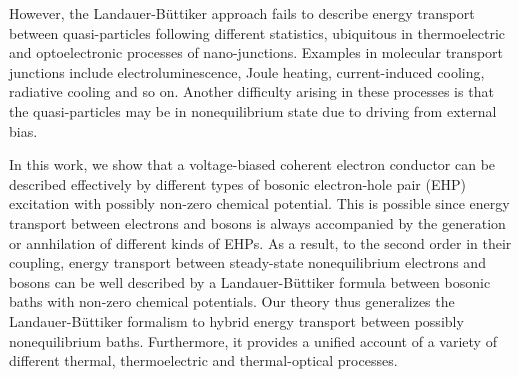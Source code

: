 \documentclass[aps
,twocolumn
,floatfix,footinbib,prl
]{revtex4-1}
\begin{document}

However, the Landauer-B\"uttiker approach fails to describe energy transport between quasi-particles following different statistics, ubiquitous in thermoelectric and optoelectronic processes of nano-junctions. Examples in molecular transport junctions include electroluminescence\cite{kuhnke2017atomic,galeprin2017photonics,schneider2010optical,schneider2012light}, Joule heating\cite{huang2007local,ioffe2008detection,lu_current-induced_2015,hartle2011resonant,hartle2011vibrational,hartle2018cooling}, current-induced cooling\cite{galperin2009cooling,simine2012vibrational,lykkebo2016single,hartle2011resonant}, radiative cooling\cite{zhu2019near} and so on. Another difficulty arising in these processes is that the quasi-particles may be in nonequilibrium state due to driving from external bias.

In this work, we show that a voltage-biased coherent electron conductor can be described effectively by different types of bosonic electron-hole pair (EHP) excitation with possibly non-zero chemical potential. 
This is possible since energy transport between electrons and bosons is always accompanied by the generation or annhilation of different kinds of EHPs\cite{headgordon_molecular_1995,dou2018perspective}.
As a result, to the second order in their coupling, energy transport between steady-state nonequilibrium electrons and bosons can be well described by a Landauer-B\"uttiker formula between bosonic baths with non-zero chemical potentials.  Our theory thus generalizes the Landauer-B\"uttiker formalism to hybrid energy transport between possibly nonequilibrium baths. Furthermore, it provides a unified account of a variety of different thermal, thermoelectric and thermal-optical processes.
\end{document}
